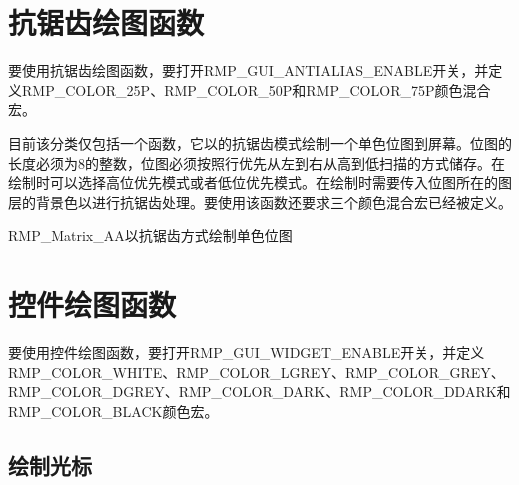 \section{抗锯齿绘图函数}\label{sec:anti-aliased-drawing-functions}

要使用抗锯齿绘图函数，要打开RMP\_GUI\_ANTIALIAS\_ENABLE开关，并定义RMP\_COLOR\_25P、RMP\_COLOR\_50P和RMP\_COLOR\_75P颜色混合宏。

目前该分类仅包括一个函数，它以的抗锯齿模式绘制一个单色位图到屏幕。位图的长度必须为8的整数，位图必须按照行优先从左到右从高到低扫描的方式储存。在绘制时可以选择高位优先模式或者低位优先模式。在绘制时需要传入位图所在的图层的背景色以进行抗锯齿处理。要使用该函数还要求三个颜色混合宏已经被定义。

\begin{apidesc}{RMP\_Matrix\_AA}{以抗锯齿方式绘制单色位图}
    \begin{apiparams}
    \end{apiparams}
    \begin{apiret}
    \end{apiret}
\end{apidesc}

\section{控件绘图函数}\label{sec:widget-drawing-functions}

要使用控件绘图函数，要打开RMP\_GUI\_WIDGET\_ENABLE开关，并定义RMP\_COLOR\_WHITE、RMP\_COLOR\_LGREY、RMP\_COLOR\_GREY、RMP\_COLOR\_DGREY、RMP\_COLOR\_DARK、RMP\_COLOR\_DDARK和RMP\_COLOR\_BLACK颜色宏。

\subsection{绘制光标}\label{subsec:draw-a-cursor}

